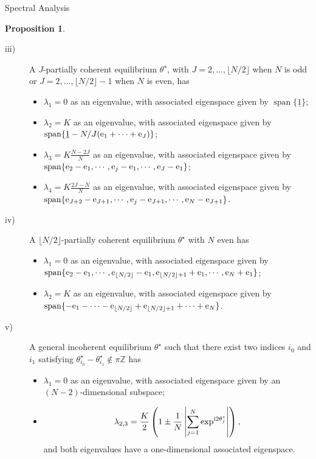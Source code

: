 \documentclass{article}
\theoremstyle{definition}
\newtheorem{proposition}[definition]{Proposition}
\newcommand{\Z}{\mathbb{Z}}
\newcommand{\e}{\textnormal{e}}
\renewcommand{\i}{\textnormal{i}}
\begin{document}
\begin{section}{Spectral Analysis}
\begin{proposition}
\begin{description}
        \item[iii)] A $J$-partially coherent equilibrium $\theta^\star$, with $J=2,\ldots,\lfloor N/2\rfloor$ when $N$ is odd or $J=2,\ldots,\lfloor N/2\rfloor-1$ when $N$ is even, has
        \begin{itemize}
            \item[$\bullet$] $\lambda_1=0$ as an eigenvalue, with associated eigenspace given by $\operatorname{span}\{\underline{1}\}$;
            \item[$\bullet$] $\lambda_2=K$ as an eigenvalue, with associated eigenspace given by $\operatorname{span}\{\underline{1}-N/J(\e_1+\cdots+\e_J)\}$;
            \item[$\bullet$] $\lambda_3=K\frac{N-2J}{N}$ as an eigenvalue, with associated eigenspace given by $\operatorname{span}\{\e_2-\e_1,\cdots,\e_j-\e_1,\cdots,\e_J-\e_1\}$;
            \item[$\bullet$] $\lambda_4=K\frac{2J-N}{N}$ as an eigenvalue, with associated eigenspace given by $\operatorname{span}\{\e_{J+2}-\e_{J+1},\cdots,\e_{j}-\e_{J+1},\cdots,\e_{N}-\e_{J+1}\}$.
        \end{itemize}

        \item[iv)] A $\lfloor N/2\rfloor$-partially coherent equilibrium $\theta^\star$ with $N$ even has
        \begin{itemize}
            \item[$\bullet$] $\lambda_1=0$ as an eigenvalue, with associated eigenspace given by $\operatorname{span}\{\e_2-\e_1,\cdots,\e_{\lfloor N/2\rfloor}-\e_1,\e_{\lfloor N/2\rfloor+1}+\e_1,\cdots,\e_N+\e_1\}$;
            \item[$\bullet$] $\lambda_2=K$ as an eigenvalue, with associated eigenspace given by $\operatorname{span}\{-\e_1-\cdots-\e_{\lfloor N/2\rfloor}+\e_{\lfloor N/2\rfloor+1}+\cdots+\e_{N}\}$.
        \end{itemize}

        \item[v)] A general incoherent equilibrium $\theta^\star$ such that there exist two indices $i_0$ and $i_1$ satisfying $\theta^\star_{i_0}-\theta^\star_{i_1}\notin\pi\Z$ has
        \begin{itemize}
            \item[$\bullet$] $\lambda_1=0$ as an eigenvalue, with associated eigenspace given by an $(N-2)$-dimensional subspace;
            \item[$\bullet$] 
            $$\lambda_{2,3}=\frac{K}{2}\left(1\pm\frac{1}{N}\left|\sum_{j=1}^N\exp^{\i2\theta^\star_j}\right|\right),$$
            and both eigenvalues have a one-dimensional associated eigenspace.
        \end{itemize}
    \end{description}
\end{proposition}


\end{section}
\end{document}
